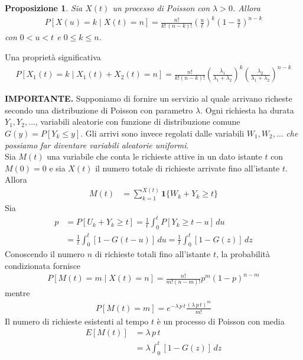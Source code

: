 \documentclass{article}
\newtheorem{proposizione}{Proposizione}[section]
\begin{document}
\begin{boxedminipage}{\textwidth}
\begin{proposizione}
Sia $X(t)$ un processo di Poisson con $\lambda > 0$. Allora
\begin{gather}
P[X(u) = k \mid X(t) = n] = \frac{n!}{k!\,(n-k)!} \left(\frac{u}{t}\right)^k\left(1-\frac{u}{t}\right)^{n-k}
\end{gather}
con $0<u<t$ e $0\le k \le n$.
\end{proposizione}
Una proprietà significativa
\begin{align}
P[X_1(t) = k \mid X_1(t) + X_2(t) = n] = \frac{n!}{k!(n-k)!}\left(\frac{\lambda_1}{\lambda_1+\lambda_2}\right)^k\left(\frac{\lambda_2}{\lambda_1+\lambda_2}\right)^{n-k}
\end{align}
\end{boxedminipage}
\bigbreak
\begin{boxedminipage}{\textwidth}
\textbf{IMPORTANTE.} Supponiamo di fornire un servizio al quale arrivano richeste secondo una distribuzione di Poisson con parametro $\lambda$. Ogni richiesta ha durata $Y_1,Y_2,\hdots$, variabili aleatorie con funzione di distribuzione comune $G(y) = P[Y_k \le y]$. Gli arrivi sono invece regolati dalle variabili $W_1,W_2,\hdots$ \textit{che possiamo far diventare variabili aleatorie uniformi}.\\
Sia $M(t)$ una variabile che conta le richieste attive in un dato istante $t$ con $M(0) = 0$ e sia $X(t)$ il numero totale di richieste arrivate fino all'istante $t$. Allora
\begin{align*}
M(t) &= \sum_{k=1}^{X(t)} \textbf{1}\{W_k + Y_k \ge t\}
\end{align*}
Sia
\begin{align*}
p &= P[U_k + Y_k \ge t] = \frac{1}{t}\int_0^t P[Y_k \ge t - u]\,du\\
&= \frac{1}{t}\int_0^t [1-G(t-u)]\,du = \frac{1}{t} \int_0^t [1-G(z)]\,dz
\end{align*}
Conoscendo il numero $n$ di richieste totali fino all'istante $t$, la probabilità condizionata fornisce
\begin{align*}
P[M(t) = m \mid X(t) = n] = \frac{n!}{m!(n-m)!} p^m (1-p)^{n-m}
\end{align*}
mentre
\begin{align*}
P[M(t) = m] = e^{-\lambda\,p\,t}\frac{(\lambda\,p\,t)^m}{m!}
\end{align*}
Il numero di richieste esistenti al tempo $t$ è un processo di Poisson con media
\begin{align*}
E[M(t)] &= \lambda\,p\,t\\
&= \lambda \int_0^t [1-G(z)]\,dz
\end{align*}
\end{boxedminipage}
\end{document}
